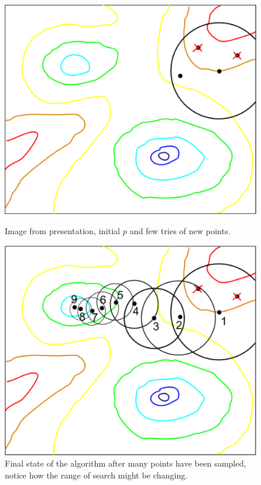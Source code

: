 \documentclass{article}
\begin{document}
\begin{figure}[h]
    \centering
    \begin{minipage}{0.4\textwidth}
        \centering
        \includegraphics[width=\linewidth]{../images/screenshot1.png}
        \caption{Image from presentation, initial $p$ and few tries of new points.}
    \end{minipage}
    \hfill
    \begin{minipage}{0.4\textwidth}
        \centering
        \includegraphics[width=\linewidth]{../images/screenshot2.png}
        \caption{Final state of the algorithm after many points have been sampled, notice how the range of search might be changing.}
    \end{minipage}
\end{figure}
\end{document}
